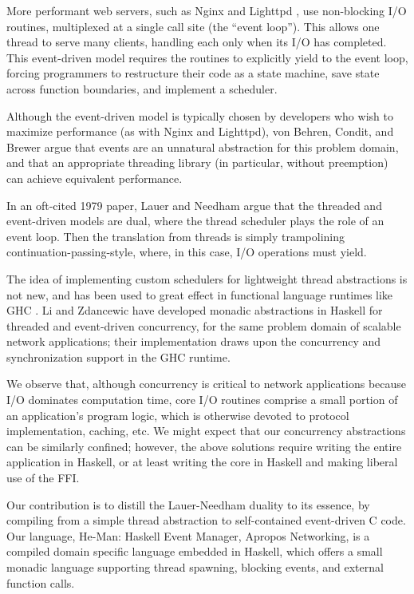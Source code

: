 \documentclass[preprint]{sigplanconf}
\begin{document}
More performant web servers, such as Nginx \cite{Nginx} and Lighttpd
\cite{Lighttpd}, use non-blocking I/O routines, multiplexed at a single call
site (the ``event loop''). This allows one thread to serve many clients,
handling each only when its I/O has completed. This event-driven model requires
the routines to explicitly yield to the event loop, forcing programmers to
restructure their code as a state machine, save state across function
boundaries, and implement a scheduler. 

Although the event-driven model is typically chosen by developers who wish to
maximize performance (as with Nginx and Lighttpd), von Behren, Condit, and
Brewer \cite{vonBehrenConditBrewer} argue that events are an unnatural
abstraction for this problem domain, and that an appropriate threading library
(in particular, without preemption) can achieve equivalent performance.

In an oft-cited 1979 paper, Lauer and Needham \cite{LauerNeedham} argue that the
threaded and event-driven models are dual, where the thread scheduler plays the
role of an event loop. Then the translation from threads is simply trampolining
continuation-passing-style, where, in this case, I/O operations must yield.

The idea of implementing custom schedulers for lightweight thread abstractions
is not new, and has been used to great effect in functional language runtimes
like GHC \cite{MarlowEtAl}. Li and Zdancewic \cite{LiZdancewic} have developed
monadic abstractions in Haskell for threaded and event-driven concurrency, for
the same problem domain of scalable network applications; their implementation
draws upon the concurrency and synchronization support in the GHC runtime.

We observe that, although concurrency is critical to network applications
because I/O dominates computation time, core I/O routines comprise a small
portion of an application's program logic, which is otherwise devoted to
protocol implementation, caching, etc. We might expect that our concurrency
abstractions can be similarly confined; however, the above solutions require
writing the entire application in Haskell, or at least writing the core in
Haskell and making liberal use of the FFI.

Our contribution is to distill the Lauer-Needham duality to its essence, by
compiling from a simple thread abstraction to self-contained event-driven C
code. Our language, He-Man: Haskell Event Manager, Apropos Networking, is a
compiled domain specific language embedded in Haskell, which offers a small
monadic language supporting thread spawning, blocking events, and external
function calls.
\end{document}

